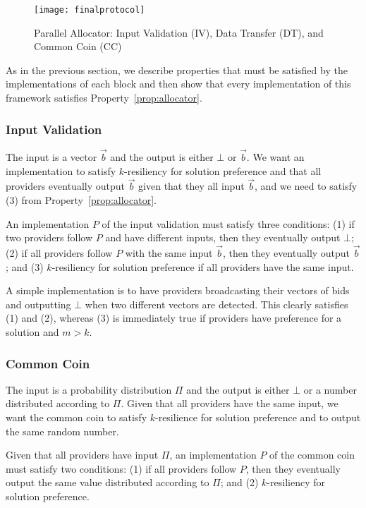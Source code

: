 \begin{figure}[tbp]
	\centering
	\texttt{[image: finalprotocol]}
	\caption[Parallel Allocator]{Parallel Allocator: Input Validation (IV), Data Transfer (DT), and Common Coin (CC)}
	\label{fig:parallel-allocator}
\end{figure}


As in the previous section, we describe properties that must be satisfied
by the implementations of each block and then show that every implementation
of this framework satisfies Property~\ref{prop:allocator}.

\subsubsection{Input Validation}
The input is a vector $\vec{b}$ and the output is either
$\bot$ or $\vec{b}$. We want an implementation to satisfy 
$k$-resiliency for solution preference and that all providers 
eventually output $\vec{b}$ given that they all input $\vec{b}$,
and we need to satisfy (3) from Property~\ref{prop:allocator}.

\begin{property}
\label{prop:iv}
An implementation $P$ of the input validation must satisfy three conditions:
(1) if two providers follow $P$ and have different inputs, then they eventually output $\bot$;
(2) if all providers follow $P$ with the same input $\vec{b}$, then they eventually output $\vec{b}$;
and (3) $k$-resiliency for solution preference if all providers have the same input.
\end{property}

A simple implementation is to have providers broadcasting their vectors of bids
and outputting $\bot$ when two different vectors are detected.
This clearly satisfies (1) and (2),
whereas (3) is immediately true if providers have preference for a solution and $m > k$.

\subsubsection{Common Coin}
The input is a probability distribution $\Pi$
and the output is either $\bot$ or a number distributed according to $\Pi$.
Given that all providers have the same input, we 
want the common coin to satisfy $k$-resilience for solution preference 
and to output the same random number.

\begin{property}
\label{prop:common-coin}
Given that all providers have input $\Pi$,
an implementation $P$ of the common coin must satisfy two conditions:
(1) if all providers follow $P$, then they eventually output 
the same value distributed according to $\Pi$;
and (2) $k$-resiliency for solution preference.
\end{property}

